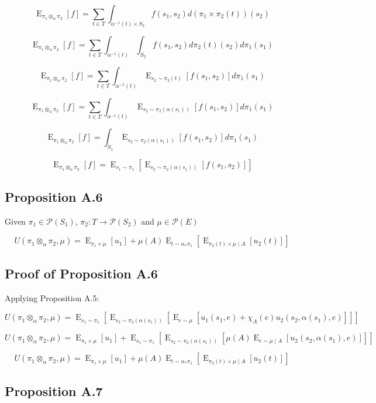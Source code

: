 \documentclass[a4paper]{article}
\DeclareMathOperator{\E}{E}
\newcommand{\Prob}{\mathcal{P}}
\begin{document}
$$\E_{\pi_1 \otimes_\alpha \pi_2}[f] = \sum_{t \in T} \int_{\alpha^{-1}(t) \times S_2} f(s_1, s_2) d(\pi_1 \times \pi_2(t))(s_2)$$

$$\E_{\pi_1 \otimes_\alpha \pi_2}[f] = \sum_{t \in T} \int_{\alpha^{-1}(t)} \int_{S_2} f(s_1, s_2) d\pi_2(t)(s_2) d\pi_1(s_1)$$

$$\E_{\pi_1 \otimes_\alpha \pi_2}[f] = \sum_{t \in T} \int_{\alpha^{-1}(t)} \E_{s_2 \sim \pi_2(t)}[f(s_1,s_2)] d\pi_1(s_1)$$

$$\E_{\pi_1 \otimes_\alpha \pi_2}[f] = \sum_{t \in T} \int_{\alpha^{-1}(t)} \E_{s_2 \sim \pi_2(\alpha(s_1))}[f(s_1,s_2)] d\pi_1(s_1)$$

$$\E_{\pi_1 \otimes_\alpha \pi_2}[f] = \int_{S_1} \E_{s_2 \sim \pi_2(\alpha(s_1))}[f(s_1,s_2)] d\pi_1(s_1)$$

$$\E_{\pi_1 \otimes_\alpha \pi_2}[f] = \E_{s_1 \sim \pi_1}[\E_{s_2 \sim \pi_2(\alpha(s_1))}[f(s_1, s_2)]]$$

\subsection{Proposition A.6}

Given ${\pi_1 \in \Prob(S_1)}$, ${\pi_2: T \rightarrow \Prob(S_2)}$ and ${\mu \in \Prob(E)}$

$$U(\pi_1 \otimes_\alpha \pi_2, \mu) = \E_{\pi_1 \times \mu}[u_1] + \mu(A) \E_{t \sim \alpha_*\pi_1}[\E_{\pi_2(t) \times \mu \mid A}[u_2(t)]]$$

\subsection{Proof of Proposition A.6}

Applying Proposition A.5:

$$U(\pi_1 \otimes_\alpha \pi_2, \mu) = \E_{s_1 \sim \pi_1}[\E_{s_2 \sim \pi_2(\alpha(s_1))}[\E_{e \sim \mu}[u_1(s_1,e)+\chi_A(e) u_2(s_2,\alpha(s_1),e)]]]$$

$$U(\pi_1 \otimes_\alpha \pi_2, \mu) = \E_{\pi_1 \times \mu}[u_1] + \E_{s_1 \sim \pi_1}[\E_{s_2 \sim \pi_2(\alpha(s_1))}[\mu(A) \E_{e \sim \mu \mid A}[u_2(s_2,\alpha(s_1),e)]]]$$

$$U(\pi_1 \otimes_\alpha \pi_2, \mu) = \E_{\pi_1 \times \mu}[u_1] + \mu(A) \E_{t \sim \alpha_*\pi_1}[\E_{\pi_2(t) \times \mu \mid A}[u_2(t)]]$$

\subsection{Proposition A.7}
\end{document}

